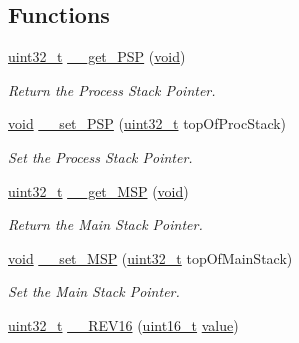 \subsection*{Functions}
\begin{DoxyCompactItemize}
\item 
\hyperlink{stdint_8h_a435d1572bf3f880d55459d9805097f62}{uint32\-\_\-t} \hyperlink{group___c_m_s_i_s___c_m3__core__definitions_ga914dfa8eff7ca53380dd54cf1d8bebd9}{\-\_\-\-\_\-get\-\_\-\-P\-S\-P} (\hyperlink{group___n_a_m_e_ga18028b8badbf1ea7e704ccac3c488e82}{void})
\begin{DoxyCompactList}\small\item\em Return the Process Stack Pointer. \end{DoxyCompactList}\item 
\hyperlink{group___n_a_m_e_ga18028b8badbf1ea7e704ccac3c488e82}{void} \hyperlink{group___c_m_s_i_s___c_m3__core__definitions_ga48e5853f417e17a8a65080f6a605b743}{\-\_\-\-\_\-set\-\_\-\-P\-S\-P} (\hyperlink{stdint_8h_a435d1572bf3f880d55459d9805097f62}{uint32\-\_\-t} top\-Of\-Proc\-Stack)
\begin{DoxyCompactList}\small\item\em Set the Process Stack Pointer. \end{DoxyCompactList}\item 
\hyperlink{stdint_8h_a435d1572bf3f880d55459d9805097f62}{uint32\-\_\-t} \hyperlink{group___c_m_s_i_s___c_m3__core__definitions_gab898559392ba027814e5bbb5a98b38d2}{\-\_\-\-\_\-get\-\_\-\-M\-S\-P} (\hyperlink{group___n_a_m_e_ga18028b8badbf1ea7e704ccac3c488e82}{void})
\begin{DoxyCompactList}\small\item\em Return the Main Stack Pointer. \end{DoxyCompactList}\item 
\hyperlink{group___n_a_m_e_ga18028b8badbf1ea7e704ccac3c488e82}{void} \hyperlink{group___c_m_s_i_s___c_m3__core__definitions_ga0bf9564ebc1613a8faba014275dac2a4}{\-\_\-\-\_\-set\-\_\-\-M\-S\-P} (\hyperlink{stdint_8h_a435d1572bf3f880d55459d9805097f62}{uint32\-\_\-t} top\-Of\-Main\-Stack)
\begin{DoxyCompactList}\small\item\em Set the Main Stack Pointer. \end{DoxyCompactList}\item 
\hyperlink{stdint_8h_a435d1572bf3f880d55459d9805097f62}{uint32\-\_\-t} \hyperlink{group___c_m_s_i_s___c_m3__core__definitions_ga8f5e0c8697e92da8a7e92732f477941d}{\-\_\-\-\_\-\-R\-E\-V16} (\hyperlink{stdint_8h_a273cf69d639a59973b6019625df33e30}{uint16\-\_\-t} \hyperlink{protocol_8h_a4e9aec275e566b978a3ccb4e043d8c61}{value})

\end{DoxyCompactItemize}
